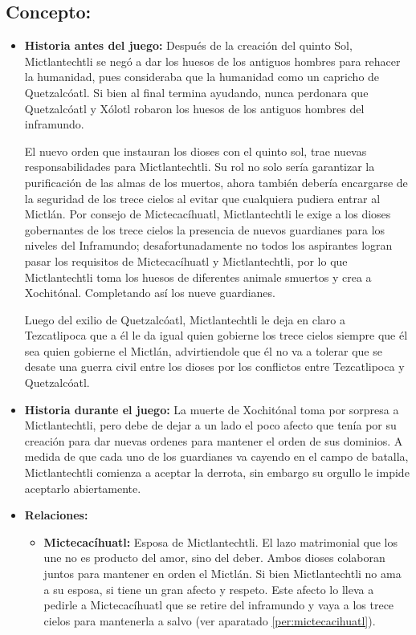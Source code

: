 \subsection{Concepto:}
\begin{itemize}
	\item \textbf{Historia antes del juego:}
	Después de la creación del quinto Sol,  Mictlantechtli se negó a dar los huesos de los antiguos hombres para rehacer la humanidad, pues consideraba que la humanidad como un capricho de Quetzalcóatl. Si bien al final termina ayudando, nunca perdonara que Quetzalcóatl y Xólotl robaron los huesos de los antiguos hombres del inframundo.
	\\
	\par
	El nuevo orden que instauran los dioses con el quinto sol, trae nuevas responsabilidades para  Mictlantechtli. Su rol no solo sería garantizar la purificación de las almas de los muertos, ahora también debería encargarse de la seguridad de los trece cielos al evitar que cualquiera pudiera entrar al Mictlán. Por consejo de  Mictecacíhuatl,  Mictlantechtli le exige a los dioses gobernantes de los trece cielos la presencia de nuevos guardianes para los niveles del Inframundo; desafortunadamente no todos los aspirantes logran pasar los requisitos de Mictecacíhuatl y  Mictlantechtli, por lo que Mictlantechtli toma los huesos de diferentes animale smuertos y crea a Xochitónal. Completando así los nueve guardianes.
	\\
	\par
	Luego del exilio de Quetzalcóatl, Mictlantechtli le deja en claro a Tezcatlipoca que a él le da igual quien gobierne los trece cielos siempre que él sea quien gobierne el Mictlán, advirtiendole que él no va a tolerar que se desate una guerra civil entre los dioses por los conflictos entre Tezcatlipoca y Quetzalcóatl. 
	\item \textbf{Historia durante el juego:}
	La muerte de Xochitónal toma por sorpresa a Mictlantechtli, pero debe de dejar a un lado el poco afecto que tenía por su creación para dar nuevas ordenes para mantener el orden de sus dominios. A medida de que cada uno de los guardianes va cayendo en el campo de batalla,  Mictlantechtli comienza a aceptar la derrota, sin embargo su orgullo le impide aceptarlo abiertamente. 
	\item \textbf{Relaciones:}
	\begin{itemize}
		\item \textbf{Mictecacíhuatl:} Esposa de Mictlantechtli. El lazo matrimonial que los une no es producto del amor, sino del deber. Ambos dioses colaboran juntos para mantener en orden el Mictlán. Si bien Mictlantechtli no ama a su esposa, si tiene un gran afecto y respeto. Este afecto lo lleva a pedirle a  Mictecacíhuatl que se retire del inframundo y vaya a los trece cielos para mantenerla a salvo (ver aparatado \ref{per:mictecacihuatl}).
		

\end{itemize}
\end{itemize}
